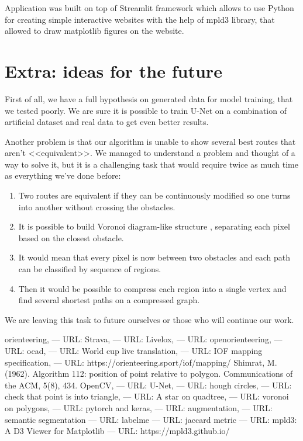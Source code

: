 \documentclass[a4paper,12pt]{extarticle}
\begin{document}
Application was built on top of Streamlit \cite{streamlit} framework which allows to use Python for creating simple interactive websites with the help of mpld3 \cite{mpld3} library, that allowed to draw matplotlib figures on the website.

\section{Extra: ideas for the future}

First of all, we have a full hypothesis on generated data for model training, that we tested poorly.
We are sure it is possible to train U-Net on a combination of artificial dataset and real data to get even better results.

Another problem is that our algorithm is unable to show several best routes that aren’t <<equivalent>>.
We managed to understand a problem and thought of a way to solve it, but it is a challenging task that would require twice as much time as everything we've done before:
\begin{enumerate}
    \item Two routes are equivalent if they can be continuously modified so one turns into another without crossing the obstacles.
    \item It is possible to build Voronoi diagram-like structure \cite{voronoipolygon}, separating each pixel based on the closest obstacle.
    \item It would mean that every pixel is now between two obstacles and each path can be classified by sequence of regions.
    \item Then it would be possible to compress each region into a single vertex and find several shortest paths on a compressed graph.
\end{enumerate}

We are leaving this task to future ourselves or those who will continue our work.






\begin{thebibliography}{00}
 orienteering, --- URL: 
 Strava, --- URL: 
 Livelox, --- URL: 
 openorienteering, --- URL: 
 ocad, --- URL: 
 World cup live translation, --- URL: 
 IOF mapping specification, --- URL: https://orienteering.sport/iof/mapping/
 Shimrat, M. (1962). Algorithm 112: position of point relative to polygon. Communications of the ACM, 5(8), 434.
 OpenCV, --- URL: 
 U-Net, --- URL: 
 hough circles, --- URL: 
 check that point is into triangle, --- URL: 
 A star on quadtree, --- URL: 
 voronoi on polygons, --- URL: 
 pytorch and keras, --- URL: 
 augmentation, --- URL: 
 semantic segmentation --- URL: 
 labelme --- URL: 
 jaccard metric --- URL: 
 mpld3: A D3 Viewer for Matplotlib --- URL:
https://mpld3.github.io/
\end{thebibliography}
	
	
\end{document}
